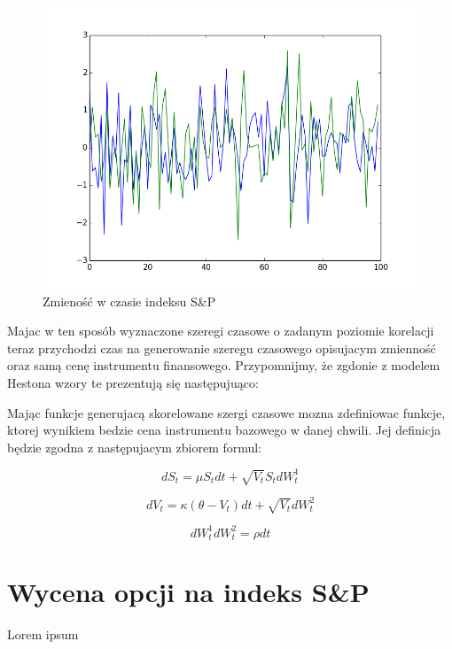 \documentclass{pracamgr}
\begin{document}
\begin{figure}
  \centering
  \includegraphics[width=150mm]{corr.png}
  \caption{Zmieność w czasie indeksu S\&P}\label{fig:vix}
\end{figure}

Majac w ten sposób wyznaczone szeregi czasowe o zadanym poziomie korelacji teraz przychodzi czas na generowanie szeregu czasowego opisujacym zmienność oraz samą cenę instrumentu finansowego. 
Przypomnijmy, że zgdonie z modelem Hestona wzory te prezentują się następujuąco:

Mając funkcje generujacą skorelowane szergi czasowe mozna zdefiniowac funkcje, ktorej wynikiem bedzie cena instrumentu bazowego w danej chwili. Jej definicja będzie zgodna z następujacym zbiorem formul: \cite{OptimalInvestment2010}

\begin{equation}
dS_t =  \mu S_t  dt + \sqrt{V_t}S_t dW_t^1
\end{equation}

\begin{equation}
dV_t =  \kappa (\theta - V_t)  dt + \sqrt{V_t} dW_t^2
\end{equation}

\begin{equation}
dW_t^1 dW_t^2  = \rho dt
\end{equation}


\chapter{Wycena opcji na indeks S\&P}\label{r:sp}
Lorem ipsum
 
\end{document}
